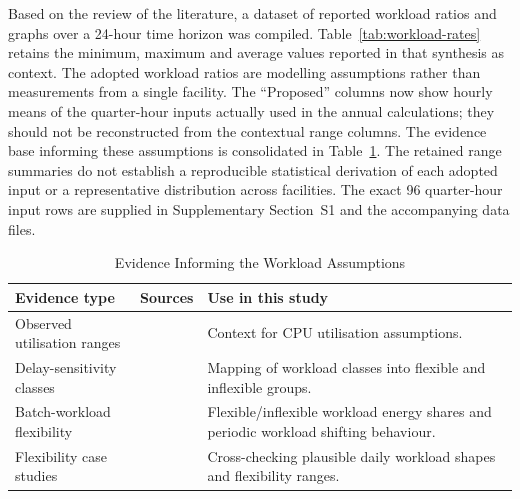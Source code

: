 \documentclass[lettersize,journal]{IEEEtran}
\newcommand{\rev}[1]{#1}
\begin{document}
Based on the review of the literature, a dataset of reported workload ratios and graphs over a 24-hour time horizon was compiled. Table~\ref{tab:workload-rates} retains the minimum, maximum and average values reported in that synthesis as context. The adopted workload ratios are modelling assumptions rather than measurements from a single facility. The ``Proposed'' columns now show hourly means of the quarter-hour inputs actually used in the annual calculations; they should not be reconstructed from the contextual range columns. \rev{The evidence base informing these assumptions is consolidated in Table~\ref{tab:workload-source-summary}. The retained range summaries do not establish a reproducible statistical derivation of each adopted input or a representative distribution across facilities. The exact 96 quarter-hour input rows are supplied in Supplementary Section~S1 and the accompanying data files.}

\begin{table}[!t]
\centering
\caption{\rev{Evidence Informing the Workload Assumptions}}
\label{tab:workload-source-summary}
\begin{scriptsize}
\rev{%
\begin{tabular}{p{}p{}p{0.36\columnwidth}}
\toprule
\textbf{Evidence type} & \textbf{Sources} & \textbf{Use in this study} \\
\midrule
Observed utilisation ranges & \cite{Zaloumis2022IBM,Ghia2011McKinsey} & Context for CPU utilisation assumptions. \\
Delay-sensitivity classes & \cite{6779441} & Mapping of workload classes into flexible and inflexible groups. \\
Batch-workload flexibility & \cite{Cao2022ApEn} & Flexible/inflexible workload energy shares and periodic workload shifting behaviour. \\
Flexibility case studies & \cite{Misaghian2023TIA,Xu2023SPIE,Zhou2024IJEPES,Fu2020ApEn,Liu2012PER} & Cross-checking plausible daily workload shapes and flexibility ranges. \\
\bottomrule
\end{tabular}}%
\end{scriptsize}
\end{table}
\end{document}
